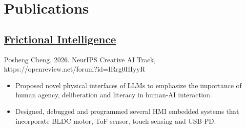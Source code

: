 \documentclass[12pt]{article}
\begin{document}
\section*{Publications}
\subsection*{\href{https://bencer3283.github.io/portfolio/thesis/}{\underline{Frictional Intelligence}}}
        {\scriptsize Posheng Cheng. 2026. NeurIPS Creative AI Track, https://openreview.net/forum?id=IRrg0HIyyR}
        {\small
        \begin{itemize}
            \item Proposed novel physical interfaces of LLMs to emphasize the importance of human agency, deliberation and literacy in human-AI interaction.
            \item Designed, debugged and programmed several HMI embedded systems that incorporate BLDC motor, ToF sensor, touch sensing and USB-PD.
        \end{itemize}
        }
\end{document}
